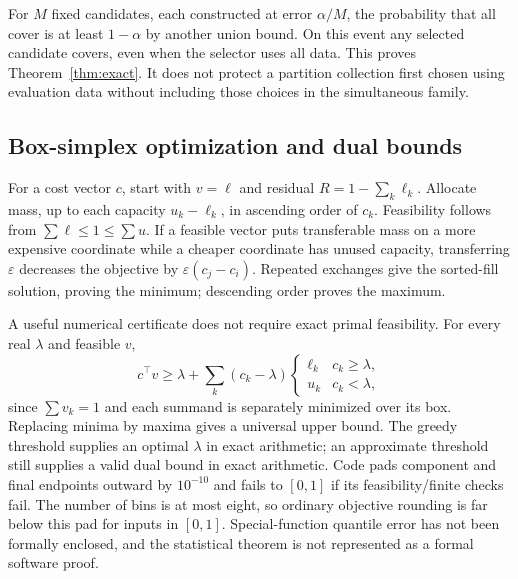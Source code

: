 \documentclass{article}
\begin{document}
For $M$ fixed candidates, each constructed at error $\alpha/M$, the probability that all cover is at least $1-\alpha$ by another union bound. On this event any selected candidate covers, even when the selector uses all data. This proves Theorem~\ref{thm:exact}. It does not protect a partition collection first chosen using evaluation data without including those choices in the simultaneous family.

\subsection{Box-simplex optimization and dual bounds}
For a cost vector $c$, start with $v=\ell$ and residual $R=1-\sum_k\ell_k$. Allocate mass, up to each capacity $u_k-\ell_k$, in ascending order of $c_k$. Feasibility follows from $\sum\ell\leq1\leq\sum u$. If a feasible vector puts transferable mass on a more expensive coordinate while a cheaper coordinate has unused capacity, transferring $\varepsilon$ decreases the objective by $\varepsilon(c_j-c_i)$. Repeated exchanges give the sorted-fill solution, proving the minimum; descending order proves the maximum.

A useful numerical certificate does not require exact primal feasibility. For every real $\lambda$ and feasible $v$,
\begin{equation}\label{eq:dualmin}
 c^\top v\geq\lambda+\sum_k(c_k-\lambda)\begin{cases}\ell_k&c_k\geq\lambda,\\u_k&c_k<\lambda,\end{cases}
\end{equation}
since $\sum v_k=1$ and each summand is separately minimized over its box. Replacing minima by maxima gives a universal upper bound. The greedy threshold supplies an optimal $\lambda$ in exact arithmetic; an approximate threshold still supplies a valid dual bound in exact arithmetic. Code pads component and final endpoints outward by $10^{-10}$ and fails to $[0,1]$ if its feasibility/finite checks fail. The number of bins is at most eight, so ordinary objective rounding is far below this pad for inputs in $[0,1]$. Special-function quantile error has not been formally enclosed, and the statistical theorem is not represented as a formal software proof.
\end{document}
